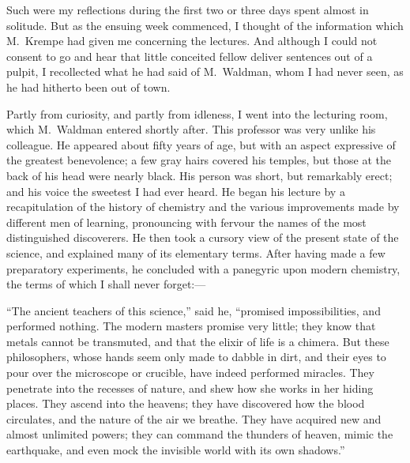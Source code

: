 Such were my reflections during the
first two or three days spent almost in
solitude. But as the ensuing week commenced,
I thought of the information
which M.~Krempe had given me concerning
the lectures. And although I
could not consent to go and hear that
little conceited fellow deliver sentences
out of a pulpit, I recollected what he
had said of M.~Waldman, whom I had
never seen, as he had hitherto been out
of town.

Partly from curiosity, and partly
from idleness, I went into the lecturing
room, which M.~Waldman entered
shortly after. This professor was very
unlike his colleague. He appeared
about fifty years of age, but with an
aspect expressive of the greatest benevolence;
a few gray hairs covered his
temples, but those at the back of his
head were nearly black. His person
was short, but remarkably erect; and his
voice the sweetest I had ever heard.
He began his lecture by a recapitulation
of the history of chemistry and
the various improvements made by different
men of learning, pronouncing
with fervour the names of the most distinguished
discoverers. He then took a
cursory view of the present state of the
science, and explained many of its elementary
terms. After having made a few
preparatory experiments, he concluded
with a panegyric upon modern chemistry,
the terms of which I shall never
forget:---

``The ancient teachers of this science,''
said he, ``prom\-ised impossibilities,
and performed nothing. The
modern masters promise very little;
they know that metals cannot be transmuted,
and that the elixir of life is a
chimera. But these philosophers,
whose hands seem only made to dabble
in dirt, and their eyes to pour over
the microscope or crucible, have indeed
performed miracles. They penetrate
into the recesses of nature, and
shew how she works in her hiding
places. They ascend into the heavens;
they have discovered how the blood
circulates, and the nature of the air we
breathe. They have acquired new and
almost unlimited powers; they can
command the thunders of heaven, mimic
the earthquake, and even mock
the invisible world with its own shadows.''

